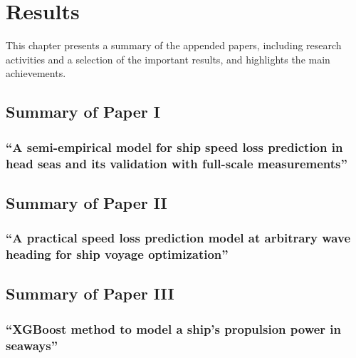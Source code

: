 
\chapter{Results}
\label{chapter:result}

This chapter presents a summary of the appended papers, including research activities and a selection of the important results, and highlights the main achievements.

\section{Summary of Paper I}
\subsection*{``A semi-empirical model for ship speed loss prediction in head seas and its validation with full-scale measurements''}


\section{Summary of Paper II}
\subsection*{``A practical speed loss prediction model at arbitrary wave heading for ship voyage optimization''}



\section{Summary of Paper III}
\subsection*{``XGBoost method to model a ship's propulsion power in seaways''}

